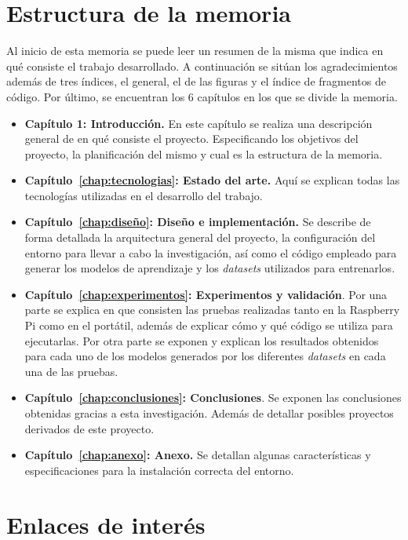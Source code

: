 \documentclass[a4paper, 12pt]{book}
\begin{document}
\section{Estructura de la memoria}
\label{sec:estructura}

Al inicio de esta memoria se puede leer un resumen de la misma que indica en qué consiste el trabajo desarrollado. A continuación se sitúan los agradecimientos además de tres índices, el general, el de las figuras y el índice de fragmentos de código. Por último, se encuentran los 6 capítulos en los que se divide la memoria.

\begin{itemize}

    \item \textbf{Capítulo 1: Introducción.} En este capítulo se realiza una descripción general de en qué consiste el proyecto. Especificando los objetivos del proyecto, la planificación del mismo y cual es la estructura de la memoria.
    \item \textbf{Capítulo~\ref{chap:tecnologias}: Estado del arte.} Aquí se explican todas las tecnologías utilizadas en el desarrollo del trabajo.
    \item \textbf{Capítulo~\ref{chap:diseño}: Diseño e implementación.} Se describe de forma detallada la arquitectura general del proyecto, la configuración del entorno para llevar a cabo la investigación, así como el código empleado para generar los modelos de aprendizaje y los \textit{datasets} utilizados para entrenarlos.
    \item \textbf{Capítulo~\ref{chap:experimentos}: Experimentos y validación}. Por una parte se explica en que consisten las pruebas realizadas tanto en la Raspberry Pi como en el portátil, además de explicar cómo y qué código se utiliza para ejecutarlas. Por otra parte se exponen y explican los resultados obtenidos para cada uno de los modelos generados por los diferentes \textit{datasets} en cada una de las pruebas.
    \item \textbf{Capítulo~\ref{chap:conclusiones}: Conclusiones}. Se exponen las conclusiones obtenidas gracias a esta investigación. Además de detallar posibles proyectos derivados de este proyecto.
    \item \textbf{Capítulo~\ref{chap:anexo}: Anexo.} Se detallan algunas características y especificaciones para la instalación correcta del entorno.
\end{itemize}

\section{Enlaces de interés}
\label{sec:enlaces_interes}
\end{document}
